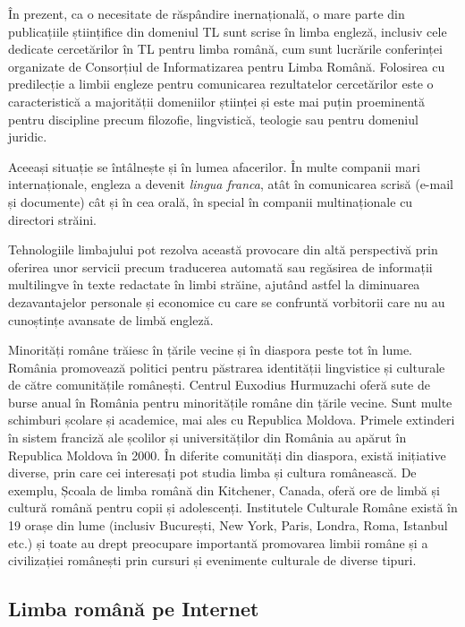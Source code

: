 \documentclass[]{../../metanetpaper}
\begin{document}
\begin{multicols}{2}

În prezent, ca o necesitate de răspândire inernațională, o mare parte din publicațiile științifice din domeniul TL sunt scrise în limba engleză, inclusiv cele dedicate cercetărilor în TL pentru limba română, cum sunt lucrările conferinței organizate de Consorțiul de Informatizarea pentru Limba Română. Folosirea cu predilecție a limbii engleze pentru comunicarea rezultatelor cercetărilor este o caracteristică a majorității domeniilor științei și este mai puțin proeminentă pentru discipline precum filozofie, lingvistică, teologie sau pentru domeniul juridic.

Aceeași situație se întâlnește și în lumea afacerilor. În multe companii mari internaționale, engleza a devenit \textit{lingua franca}, atât în comunicarea scrisă (e-mail și documente) cât și în cea orală, în special în companii multinaționale cu directori străini.

Tehnologiile limbajului pot rezolva această provocare din altă perspectivă prin oferirea unor servicii precum traducerea automată sau regăsirea de informații multilingve în texte redactate în limbi străine, ajutând astfel la diminuarea dezavantajelor personale și economice cu care se confruntă vorbitorii care nu au cunoștințe avansate de limbă engleză.

Minorități române trăiesc în țările vecine și în diaspora peste tot în lume. România promovează politici pentru păstrarea identității lingvistice și culturale de către comunitățile românești. Centrul Euxodius Hurmuzachi oferă sute de burse anual în România pentru minoritățile române din țările vecine. Sunt multe schimburi școlare și academice, mai ales cu Republica Moldova. Primele extinderi în sistem franciză ale școlilor și universităților din România au apărut în Republica Moldova în 2000.
În diferite comunități din diaspora, există inițiative diverse, prin care cei interesați pot studia limba și cultura românească. De exemplu, Școala de limba română din Kitchener, Canada, oferă ore de limbă și cultură română pentru copii și adolescenți.
Institutele Culturale Române există în 19 orașe din lume (inclusiv București, New York, Paris, Londra, Roma, Istanbul etc.) și toate au drept preocupare importantă promovarea limbii române și a civilizației românești prin cursuri și evenimente culturale de diverse tipuri.

\subsection{Limba română pe Internet}


\end{multicols}
\end{document}
